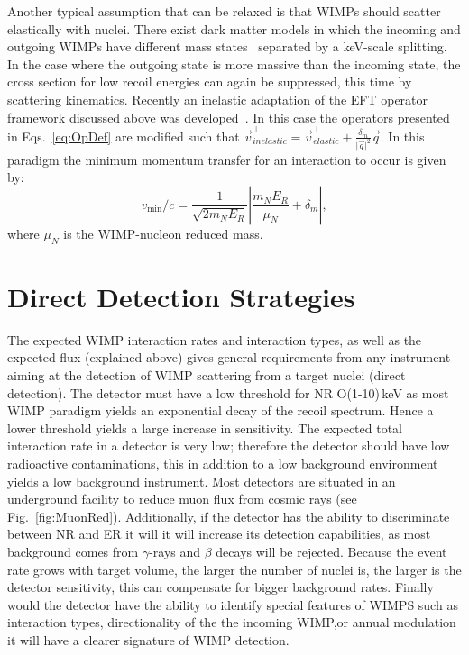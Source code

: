 	    Another typical assumption that can be relaxed is that WIMPs should scatter elastically with nuclei. There exist dark matter models in which the incoming and outgoing WIMPs have different mass states~\cite{InelasticIntro} separated by a keV-scale splitting. In the case where the outgoing state is more massive than the incoming state, the cross section for low recoil energies can again be suppressed, this time by scattering kinematics. Recently an inelastic adaptation of the EFT operator framework discussed above was developed~\cite{InelasticMath}. In this case the operators presented in Eqs.~\ref{eq:OpDef} are modified such that $\vec{v}^\perp_{inelastic} = \vec{v}^\perp_{elastic} +\frac{\delta_m}{\vert{\vec{q}}\vert^2}\vec{q}$. In this paradigm the minimum momentum transfer for an interaction to occur is given by:
\begin{equation}
  v_\mathrm{min}/c = \frac{1}{\sqrt{2 m_N E_R}} \left|\frac{m_N E_R}{\mu_N} + \delta_m\right|,
\end{equation}
where $\mu_N$ is the WIMP-nucleon reduced mass. 



\section{Direct Detection Strategies}
\label{sec:detStrtegies}

The expected WIMP interaction rates and interaction types, as well as the expected flux (explained above) gives general requirements from any instrument aiming at the detection of WIMP scattering from a target nuclei (direct detection). The detector must have a low threshold for NR O(1-10)\,keV as most WIMP paradigm yields an exponential decay of the recoil spectrum. Hence a lower threshold yields a large increase in sensitivity. The expected total interaction rate in a detector is very low; therefore the detector should have low radioactive contaminations, this in addition to a low background environment yields a low background instrument. Most detectors are situated in an underground facility to reduce muon flux from cosmic rays (see Fig.~\ref{fig:MuonRed}). Additionally, if the detector has the ability to discriminate between NR and ER it will it will increase its detection capabilities, as most background comes from $\gamma$-rays and $\beta$ decays will be rejected. Because the event rate grows with target volume, the larger the number of nuclei is, the larger is the detector sensitivity, this can compensate for bigger background rates. Finally would the detector have the ability to identify special features of WIMPS such as interaction types, directionality of the the incoming WIMP,or annual modulation it will have a clearer signature of WIMP detection.

